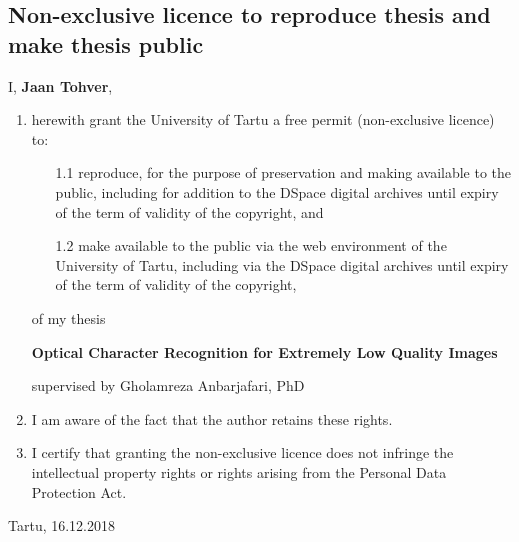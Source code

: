 \documentclass[12pt]{article}
\begin{document}

\subsection*{Non-exclusive licence to reproduce thesis and make thesis public}

I, \textbf{Jaan Tohver},

\begin{enumerate}
\item
herewith grant the University of Tartu a free permit (non-exclusive licence) to:
\begin{enumerate}
\item[1.1]
reproduce, for the purpose of preservation and making available to the public, including for addition to the DSpace digital archives until expiry of the term of validity of the copyright, and
\item[1.2]
make available to the public via the web environment of the University of Tartu, including via the DSpace digital archives until expiry of the term of validity of the copyright,
\end{enumerate}

of my thesis

\textbf{Optical Character Recognition for Extremely Low Quality Images}

supervised by Gholamreza Anbarjafari, PhD

\item
I am aware of the fact that the author retains these rights.
\item
I certify that granting the non-exclusive licence does not infringe the intellectual property rights or rights arising from the Personal Data Protection Act. 
\end{enumerate}

\noindent
Tartu, 16.12.2018
\end{document}
